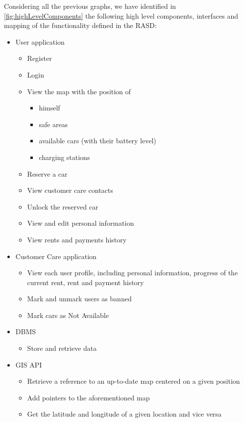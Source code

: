Considering all the previous graphs, we have identified in \autoref{fig:highLevelComponents} the following high level components, interfaces and mapping of the functionality defined in the RASD:
\begin{itemize}

	\item User application
	\begin{itemize}
		\item Register
		\item Login
		\item View the map with the position of
		\begin{itemize}
			\item himself
			\item safe areas
			\item available cars (with their battery level)
			\item charging stations
		\end{itemize}
		\item Reserve a car
		\item View customer care contacts
		\item Unlock the reserved car
		\item View and edit personal information
		\item View rents and payments history
	\end{itemize}
	\clearpage
	\item Customer Care application
	\begin{itemize}
		\item View each user profile, including personal information, progress of the current rent, rent and payment history
		\item Mark and unmark users as banned
		\item Mark cars as Not Available
	\end{itemize}
	
	\item DBMS
	\begin{itemize}
		\item Store and retrieve data
	\end{itemize}	
	
	\item GIS API
	\begin{itemize}
		\item Retrieve a reference to an up-to-date map centered on a given position
		\item Add pointers to the aforementioned map
		\item Get the latitude and longitude of a given location and vice versa
	\end{itemize}
	

\end{itemize}
